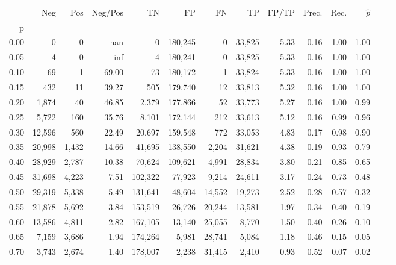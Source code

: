 \begin{tabular}{rrrrrrrrrrrrrr}
\toprule
{} &     Neg &    Pos & Neg/Pos &       TN &       FP &      FN &      TP & FP/TP & Prec. &  Rec. & $\hat{p}$ \\
p    &         &        &         &          &          &         &         &       &       &       &           \\
\midrule
0.00 &       0 &      0 &     nan &        0 &  180,245 &       0 &  33,825 &  5.33 &  0.16 &  1.00 &      1.00 \\
0.05 &       4 &      0 &     inf &        4 &  180,241 &       0 &  33,825 &  5.33 &  0.16 &  1.00 &      1.00 \\
0.10 &      69 &      1 &   69.00 &       73 &  180,172 &       1 &  33,824 &  5.33 &  0.16 &  1.00 &      1.00 \\
0.15 &     432 &     11 &   39.27 &      505 &  179,740 &      12 &  33,813 &  5.32 &  0.16 &  1.00 &      1.00 \\
0.20 &   1,874 &     40 &   46.85 &    2,379 &  177,866 &      52 &  33,773 &  5.27 &  0.16 &  1.00 &      0.99 \\
0.25 &   5,722 &    160 &   35.76 &    8,101 &  172,144 &     212 &  33,613 &  5.12 &  0.16 &  0.99 &      0.96 \\
0.30 &  12,596 &    560 &   22.49 &   20,697 &  159,548 &     772 &  33,053 &  4.83 &  0.17 &  0.98 &      0.90 \\
0.35 &  20,998 &  1,432 &   14.66 &   41,695 &  138,550 &   2,204 &  31,621 &  4.38 &  0.19 &  0.93 &      0.79 \\
0.40 &  28,929 &  2,787 &   10.38 &   70,624 &  109,621 &   4,991 &  28,834 &  3.80 &  0.21 &  0.85 &      0.65 \\
0.45 &  31,698 &  4,223 &    7.51 &  102,322 &   77,923 &   9,214 &  24,611 &  3.17 &  0.24 &  0.73 &      0.48 \\
0.50 &  29,319 &  5,338 &    5.49 &  131,641 &   48,604 &  14,552 &  19,273 &  2.52 &  0.28 &  0.57 &      0.32 \\
0.55 &  21,878 &  5,692 &    3.84 &  153,519 &   26,726 &  20,244 &  13,581 &  1.97 &  0.34 &  0.40 &      0.19 \\
0.60 &  13,586 &  4,811 &    2.82 &  167,105 &   13,140 &  25,055 &   8,770 &  1.50 &  0.40 &  0.26 &      0.10 \\
0.65 &   7,159 &  3,686 &    1.94 &  174,264 &    5,981 &  28,741 &   5,084 &  1.18 &  0.46 &  0.15 &      0.05 \\
0.70 &   3,743 &  2,674 &    1.40 &  178,007 &    2,238 &  31,415 &   2,410 &  0.93 &  0.52 &  0.07 &      0.02 \\

\end{tabular}
